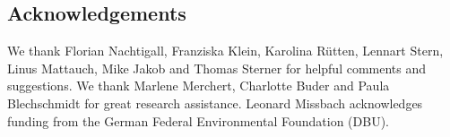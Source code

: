 \documentclass[12pt, a4paper]{article}
\begin{document}
\subsection{Acknowledgements} \label{acknowledgements}

We thank Florian Nachtigall, Franziska Klein, Karolina Rütten, Lennart Stern, Linus Mattauch, Mike Jakob and Thomas Sterner for helpful comments and suggestions. 
We thank Marlene Merchert, Charlotte Buder and Paula Blechschmidt for great research assistance. 
Leonard Missbach acknowledges funding from the German Federal Environmental Foundation (DBU).
\end{document}
